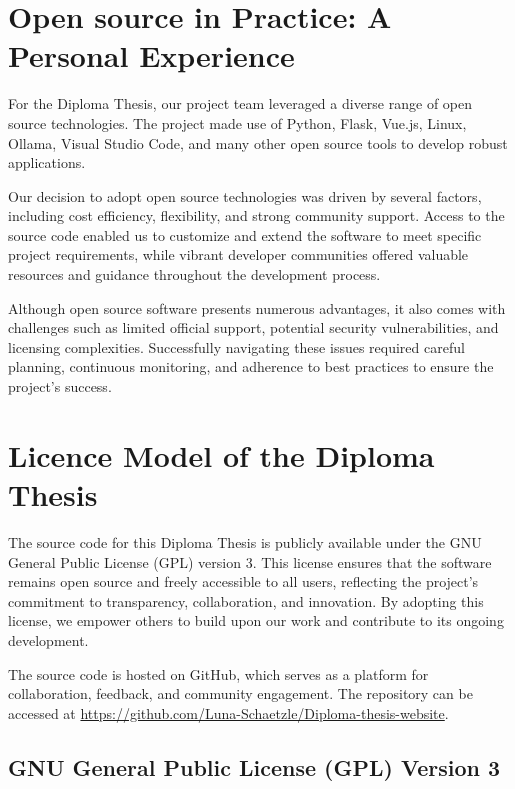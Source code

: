 \cite{Open-Source-Guide-Austria}

\section{Open source in Practice: A Personal Experience}

For the Diploma Thesis, our project team leveraged a diverse range of open source technologies. 
The project made use of Python, Flask, Vue.js, Linux, Ollama, Visual Studio Code, 
and many other open source tools to develop robust applications.

Our decision to adopt open source technologies was driven by several factors, 
including cost efficiency, flexibility, and strong community support. 
Access to the source code enabled us to customize and extend the software to meet specific project requirements, 
while vibrant developer communities offered valuable resources and guidance throughout the development process.

Although open source software presents numerous advantages, it also comes with challenges such as limited official support, 
potential security vulnerabilities, and licensing complexities. Successfully navigating these issues required careful planning, 
continuous monitoring, and adherence to best practices to ensure the project's success.

\section{Licence Model of the Diploma Thesis}

The source code for this Diploma Thesis is publicly available under the GNU General Public License (GPL) version 3. 
This license ensures that the software remains open source and freely accessible to all users, 
reflecting the project's commitment to transparency, collaboration, and innovation. By adopting this license, 
we empower others to build upon our work and contribute to its ongoing development.

The source code is hosted on GitHub, which serves as a platform for collaboration, feedback, and community engagement. 
The repository can be accessed at \url{https://github.com/Luna-Schaetzle/Diploma-thesis-website}.

\subsection{GNU General Public License (GPL) Version 3}

